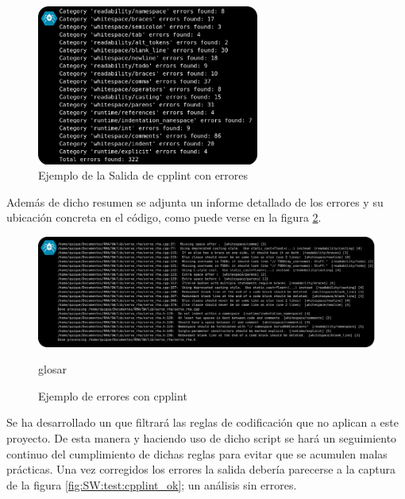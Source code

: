         \begin{figure}[H]
            \centering
            \includegraphics[width=0.65\textwidth]{figuras/Imagenes_SW/test/ReadibilityTest.jpg}
            \caption{Ejemplo de la Salida de cpplint con errores}
            \label{fig:SW:test:codif_output}
        \end{figure}

        Además de dicho resumen se adjunta un informe detallado de los errores y su ubicación concreta en el código, como puede verse en la figura \ref{fig:SW:test:error_output_cpplint}.

        \begin{figure}[H]
            \centering
            \includegraphics[width=1\textwidth]{figuras/Imagenes_SW/test/ReadibilityTest_2.jpg}
            \caption{Ejemplo de errores con cpplint}glosar
            \label{fig:SW:test:error_output_cpplint}
        \end{figure}

        Se ha desarrollado un  que filtrará las reglas de codificación que no aplican a este proyecto. De esta manera y haciendo uso de dicho script se hará un seguimiento continuo del cumplimiento de dichas reglas para evitar que se acumulen malas prácticas. Una vez corregidos los errores la salida debería parecerse a la captura de la figura \ref{fig:SW:test:cpplint_ok}; un análisis sin errores.

